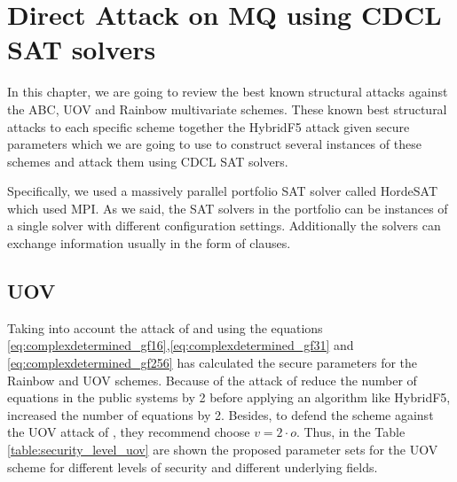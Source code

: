 
\chapter{{Direct Attack on MQ using CDCL SAT solvers}}
\label{chap:MPQC}
In this chapter, we are going to review the best known structural attacks  against the ABC, UOV and Rainbow multivariate schemes. These known best structural attacks to each specific scheme together the HybridF5 attack given secure parameters which we are going to use to construct several instances of these schemes and attack them using CDCL SAT solvers. 

Specifically, we used a massively parallel portfolio SAT solver called HordeSAT which used MPI. As we said, the SAT solvers in the portfolio can be instances of a single solver with different configuration settings. Additionally the solvers can exchange information usually in the form of clauses.
\section{UOV}
Taking into account the attack of \cite{Thomae2012} and using the equations \eqref{eq:complexdetermined_gf16},\eqref{eq:complexdetermined_gf31} and \eqref{eq:complexdetermined_gf256} \cite{AlbrechtPetzoldt2013} has calculated the secure parameters for the Rainbow and UOV schemes. Because of the attack of \cite{Thomae2012} reduce the number of equations in the public systems by 2 before applying an algorithm like HybridF5, \cite{AlbrechtPetzoldt2013} increased the number of equations by 2. Besides, to defend the scheme against the
UOV attack of \cite{Kipnis1999}, they recommend choose $v=2\cdot o$. Thus, in the Table \ref{table:security_level_uov} are shown the proposed parameter sets for the UOV scheme for different levels of security and different underlying fields.

